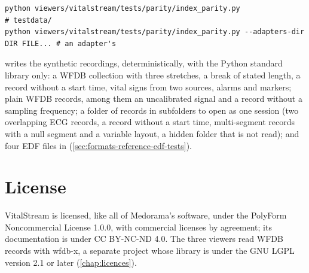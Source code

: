 \begin{lstlisting}[style=shell]
python viewers/vitalstream/tests/parity/index_parity.py                            # testdata/
python viewers/vitalstream/tests/parity/index_parity.py --adapters-dir DIR FILE... # an adapter's
\end{lstlisting}

 writes the synthetic recordings, deterministically, with the Python
standard library only: a WFDB collection with three stretches, a break of stated length, a record
without a start time, vital signs from two sources, alarms and markers; plain WFDB records, among
them an uncalibrated signal and a record without a sampling frequency; a folder of records in
subfolders to open as one session (two overlapping ECG records, a record without a start time,
multi-segment records with a null segment and a variable layout, a hidden folder that is not
read); and four EDF files in  (\cref{sec:formats-reference-edf-tests}).

\section{License}
\label{sec:vitalstream-licence}

VitalStream is licensed, like all of Medorama's software, under the PolyForm Noncommercial
License 1.0.0, with commercial licenses by agreement; its documentation is under CC BY-NC-ND 4.0. The three viewers read WFDB records with wfdb-x, a
separate project whose library is under the GNU LGPL version 2.1 or later (\cref{chap:licences}).

